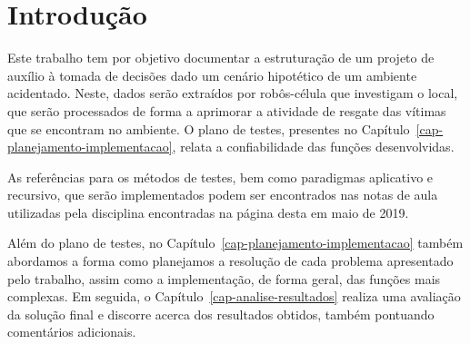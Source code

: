 \chapter*{Introdução}\label{cap-introducao} %

Este trabalho tem por objetivo documentar a estruturação de um projeto de auxílio à tomada de decisões dado um cenário hipotético de um ambiente acidentado. Neste, dados serão extraídos por robôs-célula que investigam o local, que serão processados de forma a aprimorar a atividade de resgate das vítimas que se encontram no ambiente. O plano de testes, presentes no Capítulo~\ref{cap-planejamento-implementacao}, relata a confiabilidade das funções desenvolvidas.

As referências para os métodos de testes, bem como paradigmas aplicativo e recursivo, que serão implementados podem ser encontrados nas notas de aula utilizadas pela disciplina encontradas na página desta em maio de 2019.

Além do plano de testes, no Capítulo~\ref{cap-planejamento-implementacao} também abordamos a forma como planejamos a resolução de cada problema apresentado pelo trabalho, assim como a implementação, de forma geral, das funções mais complexas. Em seguida, o Capítulo~\ref{cap-analise-resultados} realiza uma avaliação da solução final e discorre acerca dos resultados obtidos, também pontuando comentários adicionais.